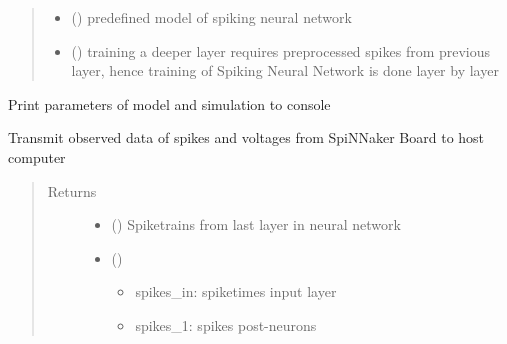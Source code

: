 \documentclass[letterpaper,10pt,english]{sphinxmanual}
\begin{document}
\begin{fulllineitems}
\begin{quote}
\begin{description}
\begin{itemize}
\item {} 
 () \textendash{} predefined model of spiking neural network

\item {} 
 () \textendash{} training a deeper layer requires preprocessed spikes from previous
layer, hence training of Spiking Neural Network is done layer by
layer

\end{itemize}

\end{description}\end{quote}

\begin{fulllineitems}
\label{\detokenize{SpikingConvNet:SpikingConvNet.classes.Spinnaker_Network.print_parameters}}
Print parameters of model and simulation to console

\end{fulllineitems}


\begin{fulllineitems}
\label{\detokenize{SpikingConvNet:SpikingConvNet.classes.Spinnaker_Network.retrieve_data}}
Transmit observed data of spikes and voltages from SpiNNaker Board
to host computer
\begin{quote}\begin{description}
\item[{Returns}] \leavevmode
\begin{itemize}
\item {} 
 () \textendash{} Spiketrains from last layer in neural network

\item {} 
 () \textendash{}
\begin{itemize}
\item {} 
spikes\_in: spiketimes input layer

\item {} 
spikes\_1: spikes post-neurons


\end{itemize}
\end{itemize}
\end{description}
\end{quote}
\end{fulllineitems}
\end{fulllineitems}
\end{document}
